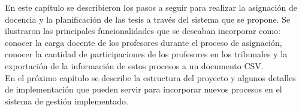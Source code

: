 En este capítulo se describieron los pasos a seguir para realizar la asignación de docencia 
y la planificación de las tesis a través del sistema que se propone. Se ilustraron las principales 
funcionalidades que se deseaban incorporar como: conocer la carga docente de los profesores durante 
el proceso de asignación, conocer la cantidad de participaciones de los profesores en los tribunales 
y la exportación de la información de estos procesos a un documento CSV. \\

En el próximo capítulo se describe la estructura del proyecto y algunos 
detalles de implementación que pueden servir para incorporar nuevos procesos 
en el sistema de gestión implementado.

